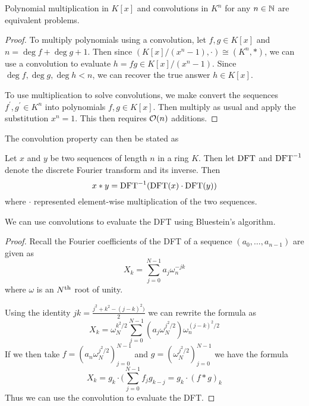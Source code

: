 \begin{corollary}
    Polynomial multiplication in $K[x]$ and convolutions in $K^n$ for any $n \in {\mathbb N}$ are equivalent problems.
\end{corollary}

\begin{proof}
    To multiply polynomials using a convolution, let $f, g \in K[x]$ and $n = \deg f + \deg g + 1$. Then since $(K[x]/(x^n - 1), \cdot) \cong (K^n, \ast)$, we can use a convolution to evaluate $h = fg \in K[x]/(x^n -1)$. Since $\deg f, \deg g, \deg h < n$, we can recover the true answer $h \in K[x]$.

    To use multiplication to solve convolutions, we make convert the sequences $f^\prime, g^\prime \in K^n$ into polynomials $f, g \in K[x]$. Then multiply as usual and apply the substitution $x^n = 1$. This then requires $\mathcal O(n)$ additions.
\end{proof}

The convolution property can then be stated as

\begin{definition}\label{def:convolution-property}
    Let $x$ and $y$ be two sequences of length $n$ in a ring $K$. Then let $\textrm{DFT}$ and $\textrm{DFT}^{-1}$ denote the discrete Fourier transform and its inverse. Then
    \[
        x \ast y = \textrm{DFT}^{-1}(\textrm{DFT}(x) \cdot \textrm{DFT}(y))
    \]
    where $\cdot$ represented element-wise multiplication of the two sequences.
\end{definition}


\begin{proposition}
    We can use convolutions to evaluate the DFT using Bluestein's algorithm.
\end{proposition}

\begin{proof}
    Recall the Fourier coefficients of the DFT of a sequence $(a_0, \ldots, a_{n-1})$ are given as
    \[
        X_k = \sum^{N-1}_{j=0} a_j\omega_n^{-jk}
    \]
    where $\omega$ is an $N^{\textrm{th}}$ root of unity.
    
    Using the identity $jk = \frac{j^2 + k^2 - (j - k)^2)}{2}$ we can rewrite the formula as
    \[
        X_k = \omega_N^{k^2/2} \sum^{N-1}_{j=0} (a_j \omega_N^{j^2/2}) \omega_n^{(j - k)^2/2}
    \]
    If we then take $f = (a_n \omega_N^{j^2/2})_{j=0}^{N-1}$ and $g = (\omega_N^{j^2/2})_{j=0}^{N-1}$ we have the formula
    \[
        X_k = g_k \cdot (\sum^{N-1}_{j=0} f_j g_{k-j} = g_k \cdot (f \ast g)_k
    \]
    Thus we can use the convolution to evaluate the DFT.
\end{proof}

